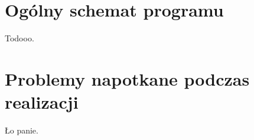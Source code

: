 \section{Ogólny schemat programu} \label{sec:scheme}
Todooo.

\section{Problemy napotkane podczas realizacji} \label{sec:problems}
Ło panie.